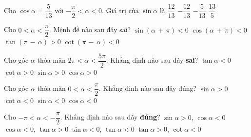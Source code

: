 \begin{ex}%
	Cho $\cos \alpha = \dfrac{5}{13}$ với $-\dfrac{\pi}{2} < \alpha < 0$. Giá trị  của $\sin \alpha$ là
	\choice 
		{$\dfrac{12}{13}$} 
		{\True  $-\dfrac{12}{13}$}
		 {$-\dfrac{5}{13}$}
		{$\dfrac{13}{5}$} 
\end{ex}

\begin{ex}%
	 Cho $ 0<\alpha <\dfrac{\pi}{2}$. Mệnh đề nào sau đây sai?
	\choice 
		{$\sin (\alpha\,+\,\pi)<0$} 
		{$\cos (\alpha\,+\,\pi)<0$} 
		 {\True $\tan (\pi\,-\,\alpha)>0$}
		{$\cot  (\pi\,-\,\alpha)<0$}
\end{ex}

\begin{ex}%
	Cho góc $\alpha $ thỏa mãn $ 2\pi <\alpha  <\dfrac{5\pi}{2}$. Khẳng định nào sau đây {\bf sai}?
	\choice 
		{\True  $\tan\alpha <0$}
		{$\cot\alpha >0$} 
		 {$\sin\alpha >0$}
		 {$\cos\alpha >0$}
\end{ex}

\begin{ex}%
	Cho góc $\alpha$  thỏa mãn $0<\alpha<\dfrac{\pi}{2}$. Khẳng định nào sau đây đúng?
	\choice 
		{\True $\sin \alpha>0$} 
		 { $\cot \alpha<0$}
		 { $\sin \alpha<0$}
		{ $\cos \alpha<0$} 
\end{ex}

\begin{ex}%
	Cho $-\pi<\alpha<-\dfrac{\pi}{2}$. Khẳng  định nào sau đây \textbf{đúng}?
	\choice 
		{$\sin \alpha>0$, $\cos  \alpha< 0$}
		{\True $\cos \alpha<0$,  $\tan \alpha>0$}
		{$\sin \alpha<0$, $\tan \alpha<0$} 
		 {$\tan \alpha>0$, $\cot \alpha<0$}
\end{ex}

